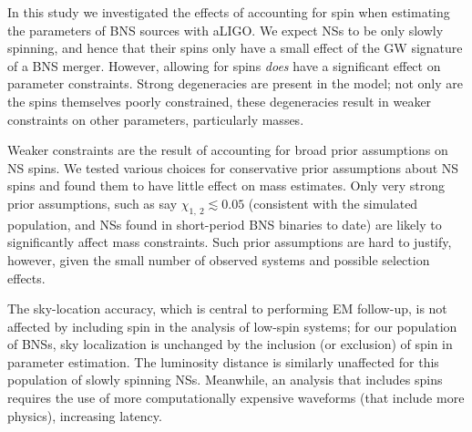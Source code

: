 In this study we investigated the effects of accounting for spin when estimating the parameters of BNS sources with aLIGO. We expect NSs to be only slowly spinning, and hence that their spins only have a small effect of the GW signature of a BNS merger. However, allowing for spins \emph{does} have a significant effect on parameter constraints. Strong degeneracies are present in the model; not only are the spins themselves poorly constrained, these degeneracies result in weaker constraints on other parameters, particularly masses.  

Weaker constraints are the result of accounting for broad prior assumptions on NS spins.  We tested various choices for conservative prior assumptions about NS spins and found them to have little effect on mass estimates.  Only very strong prior assumptions, such as say $\chi_{1,~2}\lesssim 0.05$ (consistent with the simulated population, and NSs found in short-period BNS binaries to date) are likely to significantly affect mass constraints.  Such prior assumptions are hard to justify, however, given the small number of observed systems and possible selection effects. 

The sky-location accuracy, which is central to performing EM follow-up, is not affected by including spin in the analysis of low-spin systems; for our population of BNSs, sky localization is unchanged by the inclusion (or exclusion) of spin in parameter estimation. The luminosity distance is similarly unaffected for this population of slowly spinning NSs.  Meanwhile, an analysis that includes spins requires the use of more computationally expensive waveforms (that include more physics), increasing latency.   


  
  
  
  
  